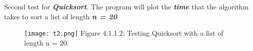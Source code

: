 \pagebreak

Second test for {\bfseries\itshape Quicksort}. The program will plot the {\bfseries\itshape time} that the algorithm takes to sort a list of length {\bfseries\itshape n = 20}. \hfill \break

{\bfseries\itshape\color{armygreen}{Observation:}} {\itshape\color{armygreen}{We are going to analyze another worst case when the list it's sorted in decreasing order.}} \hfill \break

\begin{figure}[H]
\texttt{[image: t2.png]}
\centering \linebreak \linebreak Figure 4.1.1.2: Testing Quicksort with a list of length n = 20.
\end{figure} \hfill

